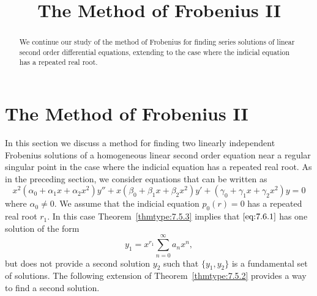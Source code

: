 \documentclass{ximera}
\title{The Method of Frobenius II}%
\begin{document}
\begin{abstract}
We continue our study of the method of Frobenius for finding series solutions of linear second order differential equations, extending to the case where the indicial equation has a repeated real root.
\end{abstract}

\maketitle

\section*{The Method of Frobenius II}

In this section we discuss a method for finding two linearly
independent Frobenius solutions of a homogeneous linear second order
equation near a regular singular point in the case where the indicial
equation has a repeated real root. As in the preceding section, we
consider equations that can be written as
\begin{equation} \label{eq:7.6.1}
x^2(\alpha_0+\alpha_1x+\alpha_2x^2)y''+x(\beta_0+\beta_1x+\beta_2x^2)y'
+(\gamma_0+\gamma_1x+\gamma_2x^2)y=0
\end{equation}
where $\alpha_0\ne0$. We assume that the indicial equation $p_0(r)=0$
has a repeated real root $r_1$. In this case Theorem~\ref{thmtype:7.5.3}
implies that $\eqref{eq:7.6.1}$ has one solution of the form
$$
y_1=x^{r_1}\sum_{n=0}^\infty a_nx^n,
$$
but does not provide a second solution $y_2$ such that $\{y_1,y_2\}$
is a fundamental set of solutions. The following extension of
Theorem~\ref{thmtype:7.5.2} provides a way to find a second solution.
\end{document}
